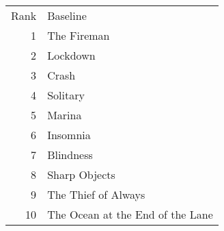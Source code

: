 \begin{tabular}{rl}
Rank & Baseline \\
1 & The Fireman \\
2 & Lockdown \\
3 & Crash \\
4 & Solitary \\
5 & Marina \\
6 & Insomnia \\
7 & Blindness \\
8 & Sharp Objects \\
9 & The Thief of Always \\
10 & The Ocean at the End of the Lane \\
\end{tabular}
